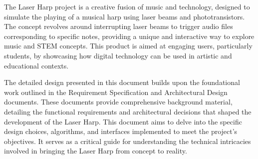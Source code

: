
The Laser Harp project is a creative fusion of music and technology, designed to simulate the playing of a musical harp using laser beams and phototransistors. The concept revolves around interrupting laser beams to trigger audio files corresponding to specific notes, providing a unique and interactive way to explore music and STEM concepts. This product is aimed at engaging users, particularly students, by showcasing how digital technology can be used in artistic and educational contexts.

The detailed design presented in this document builds upon the foundational work outlined in the Requirement Specification and Architectural Design documents. These documents provide comprehensive background material, detailing the functional requirements and architectural decisions that shaped the development of the Laser Harp. This document aims to delve into the specific design choices, algorithms, and interfaces implemented to meet the project's objectives. It serves as a critical guide for understanding the technical intricacies involved in bringing the Laser Harp from concept to reality.